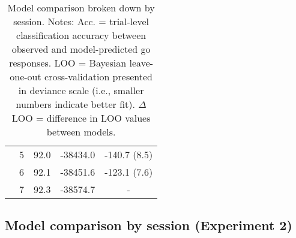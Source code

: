 \documentclass[a4paper,12pt]{article}
\begin{document}
\begin{refsection}[supp]
\begin{table}[h!]
\begin{tabular}{lcccr}
         & 5 & 92.0 & -38434.0 & -140.7 (8.5) \\
         & 6 & 92.1 & -38451.6 & -123.1 (7.6) \\
         & 7 & 92.3 & -38574.7 & \multicolumn{1}{c}{-} \\
         \bottomrule
    \end{tabular}
    \caption{Model comparison broken down by session. Notes: Acc. = trial-level classification accuracy between observed and model-predicted go responses. LOO = Bayesian leave-one-out cross-validation presented in deviance scale (i.e., smaller numbers indicate better fit). $\Delta$ LOO = difference in LOO values between models.}
    \label{tab:exp1_mc_full}
\end{table}

\clearpage
\subsection*{Model comparison by session (Experiment 2)}


\end{refsection}
\end{document}
